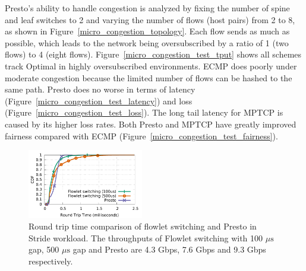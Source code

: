 Presto's ability to handle congestion is analyzed by fixing 
the number of spine and leaf switches to 2 and varying
the number of flows (host pairs) from 2 to 8, as shown
in Figure~\ref{micro_congestion_topology}. 
Each flow sends as much as possible, which leads to the network
being oversubscribed by a ratio of 1 (two flows) to 4 (eight flows).
Figure~\ref{micro_congestion_test_tput} shows all schemes track Optimal in highly
oversubscribed environments. ECMP
does poorly under moderate congestion because the limited number of flows can be hashed to the same path.
Presto does no worse in terms of latency (Figure~\ref{micro_congestion_test_latency}) and loss (Figure~\ref{micro_congestion_test_loss}).
The long tail latency for MPTCP is caused by its higher loss rates.
Both Presto and MPTCP have greatly improved fairness compared with ECMP (Figure~\ref{micro_congestion_test_fairness}).

\begin{figure}[!t]
        \centering
  \includegraphics[width=0.45\textwidth]{presto/figures/flowlets/flowlet_switching/flowlet_presto_compare_sockperf.pdf}
        \caption{Round trip time comparison of flowlet switching and Presto in Stride workload. 
		The throughputs of Flowlet switching with 100 $\mu\text{s}$ gap, 500 $\mu\text{s}$ gap and Presto 
		are 4.3 Gbps, 7.6 Gbps and 9.3 Gbps respectively. }
        \label{micro_flowlet_rtt_compare}
\end{figure}


